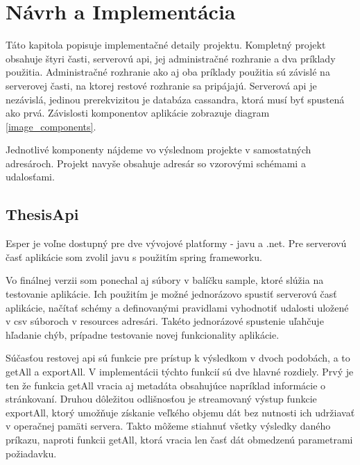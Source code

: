 \chapter{Návrh a Implementácia}
\label{chap:implementacia}

Táto kapitola popisuje implementačné detaily projektu. Kompletný projekt obsahuje štyri časti, serverovú api, jej administračné rozhranie a dva príklady použitia. Administračné rozhranie ako aj oba príklady použitia sú závislé na serverovej časti, na ktorej restové rozhranie sa pripájajú. Serverová api je nezávislá, jedinou prerekvizitou je databáza cassandra, ktorá musí byť spustená ako prvá. Závislosti komponentov aplikácie zobrazuje diagram \ref{image_components}.

Jednotlivé komponenty nájdeme vo výslednom projekte v samostatných adresároch. Projekt navyše obsahuje adresár so vzorovými schémami a udalosťami.

\section{ThesisApi}
	Esper je voľne dostupný pre dve vývojové platformy - javu a .net. Pre serverovú časť aplikácie som zvolil javu s použitím spring frameworku.

	Vo finálnej verzii som ponechal aj súbory v balíčku sample, ktoré slúžia na testovanie aplikácie. Ich použitím je možné jednorázovo spustiť serverovú časť aplikácie, načítať schémy a definovanými pravidlami vyhodnotiť udalosti uložené v csv súboroch v resources adresári. Takéto jednorázové spustenie uľahčuje hľadanie chýb, prípadne testovanie novej funkcionality aplikácie.

	Súčasťou restovej api sú funkcie pre prístup k výsledkom v dvoch podobách, a to getAll a exportAll. V implementácii týchto funkcií sú dve hlavné rozdiely. Prvý je ten že funkcia getAll vracia aj metadáta obsahujúce napríklad informácie o stránkovaní. Druhou dôležitou odlišnosťou je streamovaný výstup funkcie exportAll, ktorý umožňuje získanie veľkého objemu dát bez nutnosti ich udržiavať v operačnej pamäti servera. Takto môžeme stiahnuť všetky výsledky daného príkazu, naproti funkcii getAll, ktorá vracia len časť dát obmedzenú parametrami požiadavku.
	
